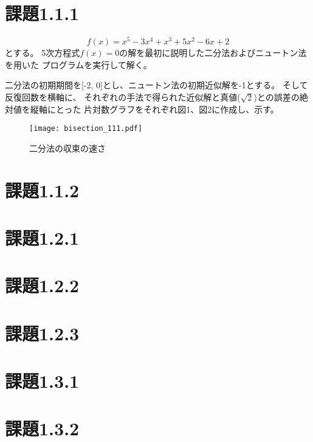 \documentclass[uplatex, 11pt,a4j, titlepage]{jsarticle}
\begin{document}
\section{課題1.1.1}
\begin{equation}
    f(x) = x^5 - 3 x^4 + x^3 + 5 x^2 - 6x + 2 
\end{equation}
とする。
5次方程式$f(x) = 0$の解を最初に説明した二分法およびニュートン法を用いた
プログラムを実行して解く。


二分法の初期期間を[-2, 0]とし、ニュートン法の初期近似解を-1とする。
そして反復回数を横軸に、
それぞれの手法で得られた近似解と真値($\sqrt{2}$)との誤差の絶対値を縦軸にとった
片対数グラフをそれぞれ図1、図2に作成し、示す。

\begin{figure}[h]
    \centering
    \texttt{[image: bisection\_111.pdf]}
    \caption{二分法の収束の速さ}
\end{figure}

\section{課題1.1.2}



\newpage


\subtitle{2020/10/*}

\section{課題1.2.1}
\section{課題1.2.2}
\section{課題1.2.3}

\newpage



\subtitle{2019/*/*}

\section{課題1.3.1}
\section{課題1.3.2}


\newpage
\thispagestyle{empty}
\nocite{key1}
\nocite{key2}


\end{document}
